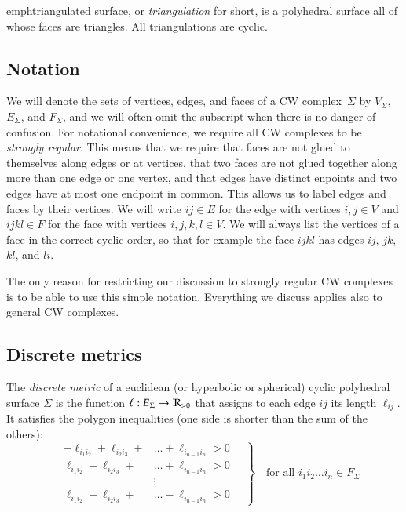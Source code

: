 \documentclass[Thesis.tex]{subfiles}
\begin{document}
emph{triangulated surface}, or \emph{triangulation} for short, is a
polyhedral surface all of whose faces are triangles.  All
triangulations are cyclic.

\subsection{Notation}

We will denote the sets of vertices, edges, and faces of a CW
complex~$\Sigma$ by $V_{\Sigma}$, $E_{\Sigma}$, and $F_{\Sigma}$, and
we will often omit the subscript when there is no danger of confusion.
For notational convenience, we require all CW complexes to be
\emph{strongly regular}. This means that we require that faces are not
glued to themselves along edges or at vertices, that two faces are not
glued together along more than one edge or one vertex, and that edges
have distinct enpoints and two edges have at most one endpoint in
common. This allows us to label edges and faces by their vertices. We
will write $\mathit{ij}\in E$ for the edge with vertices $i,j\in V$ and
$\mathit{ijkl}\in F$ for the face with vertices $i,j,k,l\in V$. We will always
list the vertices of a face in the correct cyclic order, so that for
example the face $\mathit{ijkl}$ has edges $\mathit{ij}$, $\mathit{jk}$,
$\mathit{kl}$, and $\mathit{li}$.

The only reason for restricting our discussion to strongly regular CW
complexes is to be able to use this simple notation. Everything we
discuss applies also to general CW complexes.

\subsection{Discrete metrics}
\label{sec:discrete-metrics}

The \emph{discrete metric} of a euclidean (or hyperbolic or
spherical) cyclic polyhedral surface $\Sigma$ is the function
$\ell:E_{\Sigma}\rightarrow\mathbb R_{>0}$ that assigns to each edge $ij$ its
length $\ell_{ij}$. It satisfies the polygon inequalities (one side is
shorter than the sum of the others):
\begin{equation}
\label{eq:polygon_ineq}
\left.
\quad
\begin{aligned}
-\ell_{i_{1}i_{2}}+\ell_{i_{2}i_{3}}+&\ldots+\ell_{i_{n-1}i_{n}}
>0\\
\ell_{i_{1}i_{2}}-\ell_{i_{2}i_{3}}+&\ldots+\ell_{i_{n-1}i_{n}}
>0\\
&\vdots\\
\ell_{i_{1}i_{2}}+\ell_{i_{2}i_{3}}+&\ldots-\ell_{i_{n-1}i_{n}}
>0
\end{aligned}
\quad
\right\}
\quad
\text{for all $i_{1}i_{2}\ldots i_{n}\in F_{\Sigma}$}
\end{equation}
\end{document}
